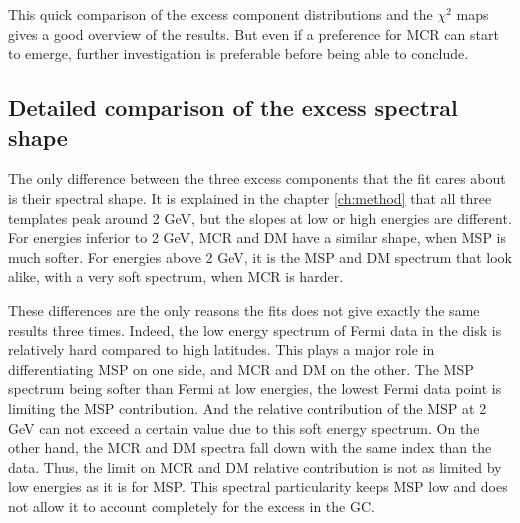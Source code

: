 This quick comparison of the excess component distributions and the $\chi^2$ maps gives a good overview of the results. But even if a preference for MCR can start to emerge, further investigation is preferable before being able to conclude.

\newpage
\subsection{Detailed comparison of the excess spectral shape}

The only difference between the three excess components that the fit cares about is their spectral shape. It is explained in the chapter \ref{ch:method} that all three templates peak around 2 GeV, but the slopes at low or high energies are different. For energies inferior to 2 GeV, MCR and DM have a similar shape, when MSP is much softer. For energies above 2 GeV, it is the MSP and DM spectrum that look alike, with a very soft spectrum, when MCR is harder.

These differences are the only reasons the fits does not give exactly the same results three times.
Indeed, the low energy spectrum of Fermi data in the disk is relatively hard compared to high latitudes. This plays a major role in differentiating MSP on one side, and MCR and DM on the other. The MSP spectrum being softer than Fermi at low energies, the lowest Fermi data point is limiting the MSP contribution. And the relative contribution of the MSP at 2 GeV can not exceed a certain value due to this soft energy spectrum. On the other hand, the MCR and DM spectra fall down with the same index than the data. Thus, the limit on MCR and DM relative contribution is not as limited by low energies as it is for MSP.
This spectral particularity keeps MSP low and does not allow it to account completely for the excess in the GC.


